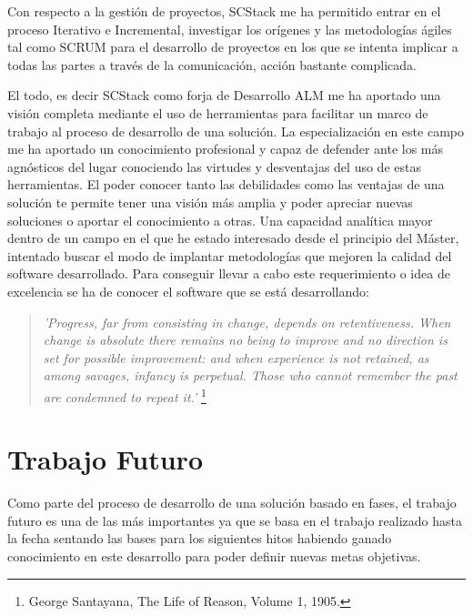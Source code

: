 \par Con respecto a la gestión de proyectos, SCStack me ha permitido entrar en el proceso Iterativo e Incremental, investigar los orígenes y las metodologías ágiles tal como SCRUM para el desarrollo de proyectos en los que se intenta implicar a todas las partes a través de la comunicación, acción bastante complicada.

\par El todo, es decir SCStack como forja de Desarrollo ALM me ha aportado una visión completa mediante el uso de herramientas para facilitar un marco de trabajo al proceso de desarrollo de una solución. La especialización en este campo me ha aportado un conocimiento profesional y capaz de defender ante los más agnósticos del lugar conociendo las virtudes y desventajas del uso de estas herramientas. El poder conocer tanto las debilidades como las ventajas de una solución te permite tener una visión más amplia y poder apreciar nuevas soluciones o aportar el conocimiento a otras. Una capacidad analítica mayor dentro de un campo en el que he estado interesado desde el principio del Máster, intentado buscar el modo de implantar metodologías que mejoren la calidad del software desarrollado. Para conseguir llevar a cabo este requerimiento o idea de excelencia se ha de conocer el software que se está desarrollando:

\begin{quote}
    \emph{'Progress, far from consisting in change, depends on retentiveness. When change is absolute there remains no being to improve and no direction is set for possible improvement: and when experience is not retained, as among savages, infancy is perpetual. Those who cannot remember the past are condemned to repeat it.'} \footnote{George Santayana, The Life of Reason, Volume 1, 1905.}
\end{quote}

\section{Trabajo Futuro}
\label{sec:trabajofuturo}

\par Como parte del proceso de desarrollo de una solución basado en fases, el trabajo futuro es una de las más importantes ya que se basa en el trabajo realizado hasta la fecha sentando las bases para los siguientes hitos habiendo ganado conocimiento en este desarrollo para poder definir nuevas metas objetivas.

